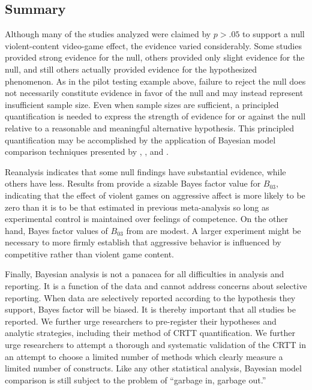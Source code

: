 \documentclass[man]{apa6}
\begin{document}
\subsection{Summary}
Although many of the studies analyzed were claimed by $p>.05$ to support a null violent-content video-game effect, the evidence varied considerably.  Some studies provided strong evidence for the null, others provided only slight evidence for the null, and still others actually provided evidence for the hypothesized phenomenon. As in the pilot testing example above, failure to reject the null does not necessarily constitute evidence in favor of the null and may instead represent insufficient sample size. Even when sample sizes are sufficient, a principled quantification is needed to express the strength of evidence for or against the null relative to a reasonable and meaningful alternative hypothesis. This principled quantification may be accomplished by the application of Bayesian model comparison techniques presented by \citet{Rouder:Morey:2012}, \citet{Rouder:etal:2012}, and \citet{Dienes:2011, Dienes:2014}. 

Reanalysis indicates that some null findings have substantial evidence, while others have less. Results from \citet{Przybylski:etal:2014} provide a sizable Bayes factor value for $B_{03}$, indicating that the effect of violent games on aggressive affect is more likely to be zero than it is to be that estimated in previous meta-analysis so long as experimental control is maintained over feelings of competence. On the other hand, Bayes factor values of $B_{03}$ from \citet{Adachi:Willoughby:2011} are modest.  A larger experiment might be necessary to more firmly establish that aggressive behavior is influenced by competitive rather than violent game content.

Finally, Bayesian analysis is not a panacea for all difficulties in analysis and reporting.  It is a function of the data and cannot address concerns about selective reporting.  When data are selectively reported according to the hypothesis they support, Bayes factor will be biased. It is thereby important that all studies be reported. We further urge researchers to pre-register their hypotheses and analytic strategies, including their method of CRTT quantification. We further urge researchers to attempt a thorough and systematic validation of the CRTT in an attempt to choose a limited number of methods which clearly measure a limited number of constructs. Like any other statistical analysis, Bayesian model comparison is still subject to the problem of ``garbage in, garbage out.''
\end{document}

